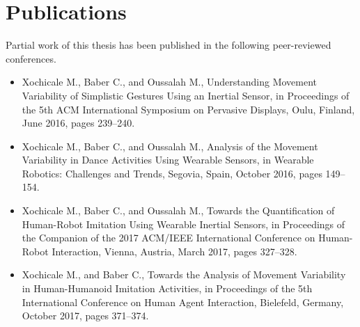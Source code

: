 \section{Publications}
Partial work of this thesis has been published in the following peer-reviewed conferences.
\begin{itemize}
\item Xochicale M., Baber C., and Oussalah M.,
	Understanding Movement Variability of Simplistic Gestures Using an Inertial Sensor,
	in Proceedings of the 5th ACM International Symposium on Pervasive Displays, 
	Oulu, Finland, June 2016, 
	pages 239--240.

\item Xochicale M., Baber C., and Oussalah M.,
	Analysis of the Movement Variability in Dance Activities Using Wearable Sensors,
	in Wearable Robotics: Challenges and Trends,
	Segovia, Spain, October 2016,
	pages 149--154.

\item Xochicale M., Baber C., and Oussalah M.,
	Towards the Quantification of Human-Robot Imitation Using Wearable Inertial Sensors,
	in Proceedings of the Companion of the 2017 ACM/IEEE International Conference on Human-Robot Interaction,
	Vienna, Austria, March 2017,
	pages 327--328.

\item Xochicale M., and Baber C.,
	Towards the Analysis of Movement Variability in Human-Humanoid Imitation Activities,
	in Proceedings of the 5th International Conference on Human Agent Interaction,
	Bielefeld, Germany, October 2017,
	pages 371--374.
\end{itemize}


